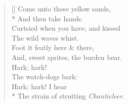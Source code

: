 \documentclass[MAIN]{subfiles}
\begin{document}
\settowidth{\versewidth}{Come unto these yellow sands,}
\begin{verse}[\versewidth]
Come unto these yellow sands,\\*
\vin And then take hands.\\
Curtsied when you have, and kissed\\
\vin The wild waves whist.\\
Foot it featly here \& there,\\
And, sweet sprites, the burden bear.\\
\vin \vin Hark; hark!\\
\vin \vin The watch-dogs bark:\\
\vin \vin Hark; hark! I hear\\*
The strain of strutting \emph{Chanticleer}.
\end{verse}
\end{document}
